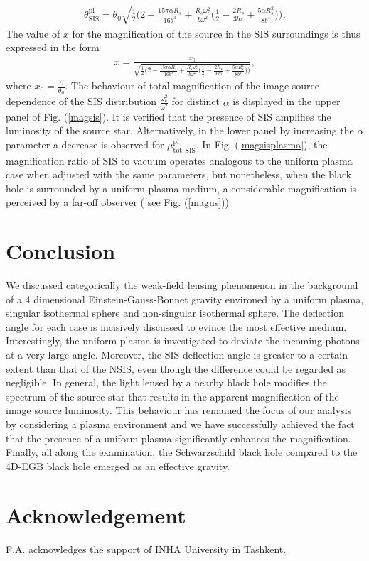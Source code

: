 \documentclass[final,5p,times,twocolumn,unknownkeysallowed]{elsarticle}
\begin{document}
\begin{align}
\theta^\mathrm{pl}_\mathrm{SIS}=\theta_0\sqrt{\frac{1}{2}\bigg(2-\frac{15\pi \alpha R_s}{16b^3}+\frac{R_s\omega^2_c}{b\omega^2}\bigg(
\frac{1}{2}-\frac{2R_s}{3b\pi}+\frac{5\alpha R^2_s}{8b^4}\bigg)\bigg)}.
\end{align}
The value of $x$ for the magnification of the source in the SIS surroundings is thus expressed in the form
\begin{align}
x=\frac{x_0}{\sqrt{\frac{1}{2}\bigg(2-\frac{15\pi \alpha R_s}
{16b^3}+\frac{R_s\omega^2_c}{b\omega^2}\bigg(\frac{1}{2}-\frac{2R_s}{3b\pi}+\frac{5\alpha R^2_s}{8b^4}\bigg)\bigg)}},
\end{align}
where $x_0=\frac{\beta}{\theta_0}$. The behaviour of total magnification of the image source dependence of the SIS distribution $\frac{\omega^2_c}{\omega^2}$
for  distinct $\alpha$ is displayed in the upper panel of Fig. (\ref{magsis}). It is verified that the presence
of SIS amplifies the luminosity of the source star.
Alternatively, in the lower panel by increasing the $\alpha$ parameter a decrease is observed for $\mu^\mathrm{pl}_\mathrm{tot,SIS}$.
In Fig. (\ref{magsisplasma}), the magnification ratio of SIS to vacuum operates analogous to the uniform
plasma case when adjusted with the same parameters, but nonetheless, when the black hole is surrounded by a uniform plasma medium,
a considerable magnification is perceived by a far-off observer ( see Fig. (\ref{magus}))




\section{Conclusion} \label{con}
We discussed categorically the weak-field lensing phenomenon in the background of a 4 dimensional
Einstein-Gauss-Bonnet gravity environed by a uniform plasma, singular isothermal sphere and non-singular isothermal sphere.
The deflection angle for each case is incisively discussed to evince the most effective medium. Interestingly, the
uniform plasma is investigated to deviate the incoming photons at a very large angle.
Moreover, the SIS deflection angle is greater to a certain extent
than that of the NSIS, even though the difference could be regarded as negligible.
In general, the light lensed by a nearby black hole modifies the spectrum of the source star that results in the apparent
magnification of the image source luminosity. This behaviour has remained the focus of our analysis by considering
a plasma environment and we have successfully achieved the fact that the presence of a uniform plasma significantly enhances the magnification.
Finally, all along the examination, the Schwarzschild black hole compared to the 4D-EGB black hole emerged as an effective gravity.

\section{Acknowledgement} F.A. acknowledges the support of INHA
University in Tashkent.



\end{document}
